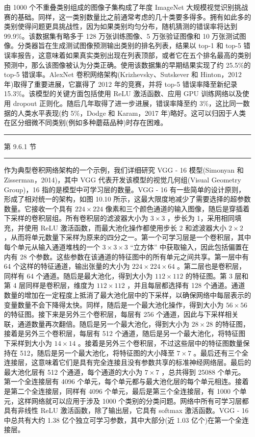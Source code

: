 \documentclass[10pt]{article}
\newcommand{\HRule}{\begin{center}\rule{0.9\linewidth}{0.2mm}\end{center}}
\begin{document}
由 1000 个不重叠类别组成的图像子集构成了年度 ImageNet 大规模视觉识别挑战赛的基础。同样，这一类别数量比之前通常考虑的几十类要多得多。拥有如此多的类别使得问题更具挑战性，因为如果类别均匀分布，随机猜测的错误率将达到 99.9\%。该数据集有略多于 128 万张训练图像、5 万张验证图像和 10 万张测试图像。分类器旨在生成测试图像预测输出类别的排名列表，结果以 top-1 和 top-5 错误率报告，这意味着如果真实类别出现在列表顶部，或者它在五个排名最高的类别预测中，那么该图像被认为分类正确。使用该数据集的早期结果实现了约 25.5\%的 top-5 错误率。AlexNet 卷积网络架构(Krizhevsky、Sutskever 和 Hinton，2012 年)取得了重要进展，它赢得了 2012 年的竞赛，并将 top-5 错误率降至新纪录 15.3\%。该模型的关键方面包括使用 ReLU 激活函数、应用 GPU 训练网络以及使用 dropout 正则化。随后几年取得了进一步进展，错误率降至约 3\%，这比同一数据的人类水平表现(约 5\%，Dodge 和 Karam，2017 年)略好。这可以归因于人类在区分细微不同类别(例如多种蘑菇品种)时存在困难。

\HRule

第 9.6.1 节

\HRule

作为典型卷积网络架构的一个示例，我们详细研究 VGG - 16 模型(Simonyan 和 Zisserman，2014)，其中 VGG 代表开发该模型的视觉几何组(Visual Geometry Group)，16 指的是模型中可学习层的数量。VGG - 16 有一些简单的设计原则，形成了相对统一的架构，如图 10.10 所示，这最大限度地减少了需要选择的超参数数量。它接收一个具有 \({224} \times  {224}\) 像素和三个颜色通道的输入图像，随后是穿插着下采样的卷积层组。所有卷积层的滤波器大小为 \(3 \times  3\) ，步长为 1，采用相同填充，并使用 ReLU 激活函数，而最大池化操作都使用步长 2 和滤波器大小 \(2 \times  2\) ，从而将单元数量下采样为原来的四分之一。第一个可学习层是一个卷积层，其中每个单元从输入通道堆栈的一个 \(3 \times  3 \times  3\) “立方体” 中获取输入，因此包括偏置在内有 28 个参数。这些参数在该通道的特征图中的所有单元之间共享。第一层中有 64 个这样的特征通道，输出张量的大小为 \({224} \times  {224} \times  {64}\) 。第二层也是卷积层，同样有 64 个通道。随后是最大池化，得到大小为 \({112} \times  {112}\) 的特征图。第 3 层和第 4 层同样是卷积层，维度为 \({112} \times  {112}\) ，并且每层都选择有 128 个通道。通道数量的增加在一定程度上抵消了最大池化层中的下采样，以确保网络中每层表示的变量数量不会下降得太快。同样，随后是一个最大池化操作，得到大小为 \({56} \times  {56}\) 的特征图。接下来是另外三个卷积层，每层有 256 个通道，因此与下采样相关联，通道数量再次翻倍。随后是另一个最大池化，得到大小为 \({28} \times  {28}\) 的特征图，接着是另外三个卷积层，每层有 512 个通道，随后是另一个最大池化，将特征图下采样到大小为 \({14} \times  {14}\) 。接着是另外三个卷积层，不过这些层中的特征图数量保持在 512，随后是另一个最大池化，将特征图的大小降至 \(7 \times  7\) 。最后还有三个全连接层，这意味着它们是具有完全连接且没有参数共享的标准神经网络层。最后的最大池化层有 512 个通道，每个通道的大小为 \(7 \times  7\) ，总共得到 25088 个单元。第一个全连接层有 4096 个单元，每个单元都与最大池化层的每个单元相连。接着是第二个全连接层，同样有 4096 个单元，最后是第三个全连接层，有 1000 个单元，这样网络就可以应用于涉及 1000 个类别的分类问题。网络中所有可学习层都具有非线性 ReLU 激活函数，除了输出层，它具有 softmax 激活函数。VGG - 16 中总共有大约 1.38 亿个独立可学习参数，其中大部分(近 1.03 亿个)在第一个全连接层。
\end{document}
